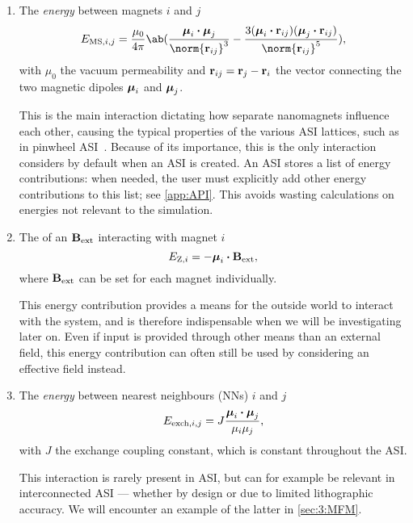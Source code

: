 \begin{enumerate}
	\item The \emph{ energy} between magnets $i$ and $j$
	\begin{equation}
		\label{eq:2:E_MS}
		E_{\mathrm{MS},i,j} = \frac{\mu_0}{4 \pi} \ab(\frac{\vc{\mu}_i \bcdot \vc{\mu}_j}{\norm{\vc{r}_{ij}}^3} - \frac{3(\vc{\mu}_i \bcdot \vc{r}_{ij}) (\vc{\mu}_j \bcdot \vc{r}_{ij})}{\norm{\vc{r}_{ij}}^5}) \mathrm{,}
	\end{equation}
	with $\mu_0$ the vacuum permeability and $\boldsymbol{\mathbf{r}}_{ij} = \boldsymbol{\mathbf{r}}_j - \boldsymbol{\mathbf{r}}_i$ the vector connecting the two magnetic dipoles $\boldsymbol{\mathbf{\mu}}_i$ and $\boldsymbol{\mathbf{\mu}}_j$. \par
	This is the main interaction dictating how separate nanomagnets influence each other, causing the typical properties of the various ASI lattices, such as  in pinwheel ASI~\cite{li2018pinwheel}.
	Because of its importance, this is the only interaction \hotspice considers by default when an ASI is created.
	An ASI stores a list of energy contributions: when needed, the user must explicitly add other energy contributions to this list; see \cref{app:API}.
	This avoids wasting calculations on energies not relevant to the simulation.
	
	\item The  of an  $\boldsymbol{\mathbf{B}}_\mathrm{ext}$ interacting with magnet $i$
	\begin{equation}
		\label{eq:2:E_Z}
		E_{\mathrm{Z},i} = -\boldsymbol{\mathbf{\mu}}_i \boldsymbol{\cdot} \boldsymbol{\mathbf{B}}_\mathrm{ext} \mathrm{,}
	\end{equation}
	where $\boldsymbol{\mathbf{B}}_\mathrm{ext}$ can be set for each magnet individually. \par
	This energy contribution provides a means for the outside world to interact with the system, and is therefore indispensable when we will be investigating  later on.
	Even if input is provided through other means than an external field, this energy contribution can often still be used by considering an effective field instead.
	
	\item The \textit{ energy} between nearest neighbours (NNs) $i$ and $j$
	\begin{equation}
		\label{eq:2:E_exch}
		E_{\mathrm{exch},i,j} = J \frac{\boldsymbol{\mathbf{\mu}}_i \boldsymbol{\cdot} \boldsymbol{\mathbf{\mu}}_j}{\mu_i \mu_j} \mathrm{,}
	\end{equation}
	with $J$ the exchange coupling constant, which is constant throughout the ASI. \par
	This interaction is rarely present in ASI, but can for example be relevant in interconnected ASI --- whether by design or due to limited lithographic accuracy.
	We will encounter an example of the latter in \cref{sec:3:MFM}.
\end{enumerate}

